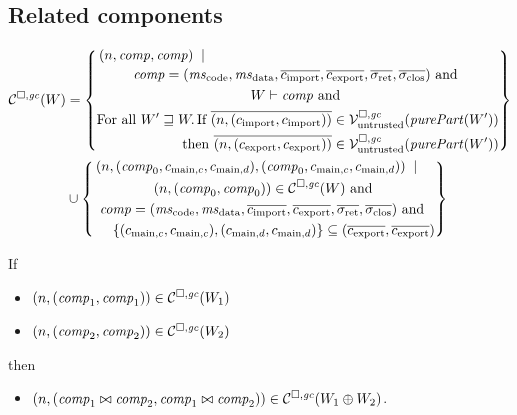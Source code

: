 \documentclass[a4paper]{article}
\begin{document}
\subsection{Related components}
\label{sec:related-components}

\begin{align*}
  \lrcomp(W) &=
  \left\{\begin{multlined}
     \npair{\var{comp},\var{comp}} \;\mid \;\\
      \var{comp} = (\mscode,\msdata,\overline{c_{\mathrm{import}}},\overline{c_{\mathrm{export}}},\sigrets,\sigcloss) \tand \\
      W \vdash \var{comp} \tand\\
      \text{For all } W' \future W \ldotp \text{If } \overline{\npair{(c_{\mathrm{import}},c_{\mathrm{import}})}} \in \lrv(\purePart{W'})\\
      \text{then } \overline{\npair{(c_{\mathrm{export}},c_{\mathrm{export}})}} \in \lrv(\purePart{W'})
  \end{multlined}
    \right\}\\
  &\cup \left\{
    \begin{multlined}
     \npair{(\var{comp}_0,c_{\mathrm{main},c}, c_{\mathrm{main},d}),(\var{comp}_0,c_{\mathrm{main},c}, c_{\mathrm{main},d})} \;\mid \;\\
     \npair{(\var{comp}_0,\var{comp}_0)} \in \lrcomp(W) \tand\\
      \var{comp} = (\mscode,\msdata,\overline{c_{\mathrm{import}}},\overline{c_{\mathrm{export}}},\sigrets,\sigcloss) \tand \\
     \{(c_{\mathrm{main},c}, c_{\mathrm{main},c}),(c_{\mathrm{main},d}, c_{\mathrm{main},d})\} \subseteq (\overline{c_{\mathrm{export}}},\overline{c_{\mathrm{export}}})
       \end{multlined}
    \right\} 
\end{align*}

\begin{lemma}
  If
  \begin{itemize}
  \item $\left(n,(\mathit{comp}_1,\mathit{comp}_1)\right) \in \mathcal{C}^{\square,\mathit{gc}}(W_1)$
  \item $\left(n,(\mathit{comp}_2,\mathit{comp}_2)\right) \in \mathcal{C}^{\square,\mathit{gc}}(W_2)$
  \end{itemize}
  then
  \begin{itemize}
  \item $\left(n,(\mathit{comp}_1 \bowtie \mathit{comp}_2,\mathit{comp}_1\bowtie\mathit{comp}_2)\right) \in \mathcal{C}^{\square,\mathit{gc}}(W_1\oplus W_2)$.
  \end{itemize}
\end{lemma}
\end{document}
